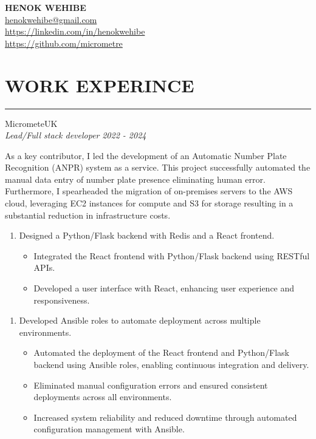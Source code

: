 \documentclass{article}
\begin{document}
\begin{center}
\textbf{\huge HENOK WEHIBE} \\
\vspace{1.5em}
\href{mailto:henokwehibe@gmail.com}{henokwehibe@gmail.com} \\
\vspace{1.0em}
\href{https://linkedin.com/in/henokwehibe}{https://linkedin.com/in/henokwehibe}\\
\vspace{1.0em}
\href{https://github.com/micrometre}{https://github.com/micrometre }\\
\end{center}
\vspace{-4.6em}
\section* {WORK EXPERINCE}
\vspace{0.6em}
\hrule 
{\bf}{} MicrometeUK \hfill {} \\%
{\em Lead/Full stack developer} \hfill {\em 2022 - 2024 } %

As a key contributor, I led the development of an Automatic Number Plate Recognition (ANPR) system as a service. 
This project successfully automated the manual data entry of number plate presence  eliminating human error.
Furthermore, I spearheaded the migration of on-premises servers to the AWS cloud, 
leveraging EC2 instances for compute and  S3 for storage resulting in a substantial reduction in infrastructure costs.



\begin{enumerate}
    \item[] Designed a Python/Flask backend with Redis and a React frontend. 
   \begin{itemize}
    \item Integrated the React frontend with  Python/Flask backend using RESTful APIs.
    \item Developed a  user interface with React, enhancing user experience and responsiveness.
   \end{itemize}
\end{enumerate}


\begin{enumerate}
    \item[] Developed Ansible roles to automate deployment across multiple environments.
   \begin{itemize}
    \item Automated the deployment of the React frontend and Python/Flask backend using Ansible roles, enabling continuous integration and delivery.
    \item Eliminated manual configuration errors and ensured consistent deployments across all environments.  
    \item Increased system reliability and reduced downtime through automated configuration management with Ansible.
   \end{itemize}
\end{enumerate}
\end{document}

